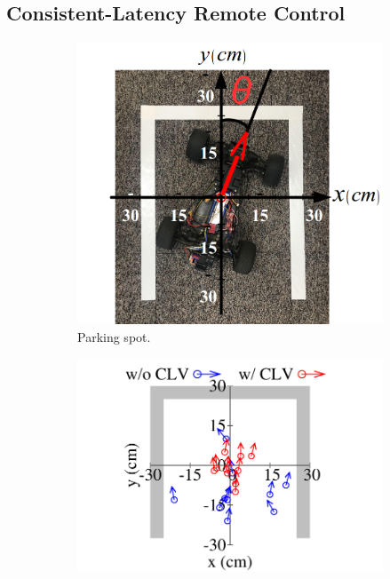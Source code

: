 \subsection{Consistent-Latency Remote Control}


\begin{figure}[ht]
  \begin{subfigure}[t]{0.20\textwidth}
    \includegraphics[width=\linewidth]{Figs/RTDrive/evaluation/car.png}
    \caption{Parking spot.}
    \label{parking_car}
  \end{subfigure}
  \begin{subfigure}[t]{0.26\textwidth}
    \includegraphics[width=\linewidth]{Figs/RTDrive/evaluation/position_fewerpoints.pdf}

\end{subfigure}
\end{figure}
